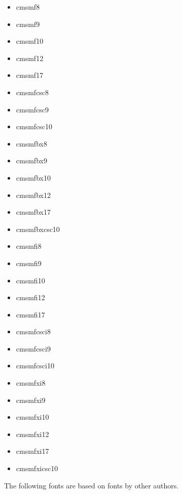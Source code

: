 \documentclass{amsart}
\begin{document}
\noindent{}\textwidth\parbox[t]{0.235\textwidth}{
\begin{itemize}[leftmargin=*]
\item \textsf{cmsmf8}
\item \textsf{cmsmf9}
\item \textsf{cmsmf10}
\item \textsf{cmsmf12}
\item \textsf{cmsmf17}
\item \textsf{cmsmfcsc8}
\item \textsf{cmsmfcsc9}
\item \textsf{cmsmfcsc10}
\end{itemize}\par}\parbox[t]{0.235\textwidth}
{\begin{itemize}[leftmargin=*]
\item \textsf{cmsmfbx8}
\item \textsf{cmsmfbx9}
\item \textsf{cmsmfbx10}
\item \textsf{cmsmfbx12}
\item \textsf{cmsmfbx17}
\item \textsf{cmsmfbxcsc10}
\end{itemize}}\parbox[t]{0.235\textwidth}
{\begin{itemize}[leftmargin=*]
\item \textsf{cmsmfi8}
\item \textsf{cmsmfi9}
\item \textsf{cmsmfi10}
\item \textsf{cmsmfi12}
\item \textsf{cmsmfi17}
\item \textsf{cmsmfcsci8}
\item \textsf{cmsmfcsci9}
\item \textsf{cmsmfcsci10}
\end{itemize}}\parbox[t]{0.235\textwidth}
{\begin{itemize}[leftmargin=*]
\item \textsf{cmsmfxi8}
\item \textsf{cmsmfxi9}
\item \textsf{cmsmfxi10}
\item \textsf{cmsmfxi12}
\item \textsf{cmsmfxi17}
\item \textsf{cmsmfxicsc10}
\end{itemize}}


\bigskip


The following fonts are based on fonts by other authors.
\end{document}
